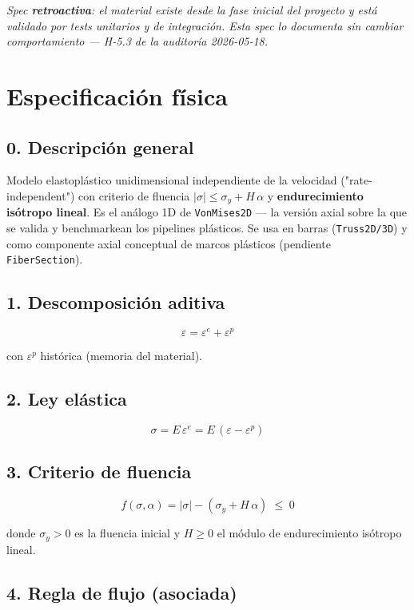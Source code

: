\documentclass[11pt,letterpaper,oneside]{report}
\begin{document}
\textit{Spec \textbf{retroactiva}: el material existe desde la fase inicial del proyecto y está validado por tests unitarios y de integración. Esta spec lo documenta sin cambiar comportamiento --- H-5.3 de la auditoría 2026-05-18.}



\section{Especificación física}

\subsection{0. Descripción general}

Modelo elastoplástico unidimensional independiente de la velocidad ("rate-independent") con criterio de fluencia $|\sigma| \leq \sigma_y + H\,\alpha$ y \textbf{endurecimiento isótropo lineal}. Es el análogo 1D de \texttt{VonMises2D} --- la versión axial sobre la que se valida y benchmarkean los pipelines plásticos. Se usa en barras (\texttt{Truss2D/3D}) y como componente axial conceptual de marcos plásticos (pendiente \texttt{FiberSection}).

\subsection{1. Descomposición aditiva}

\[
\varepsilon = \varepsilon^e + \varepsilon^p
\]

con $\varepsilon^p$ histórica (memoria del material).

\subsection{2. Ley elástica}

\[
\sigma = E\,\varepsilon^e = E\,(\varepsilon - \varepsilon^p)
\]

\subsection{3. Criterio de fluencia}

\[
f(\sigma, \alpha) = |\sigma| - (\sigma_y + H\,\alpha) \;\leq\; 0
\]

donde $\sigma_y > 0$ es la fluencia inicial y $H \geq 0$ el módulo de endurecimiento isótropo lineal.

\subsection{4. Regla de flujo (asociada)}
\end{document}
